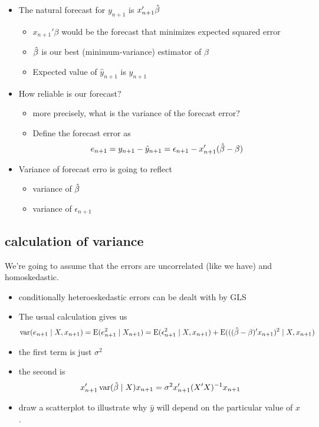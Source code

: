\begin{itemize}
\item The natural forecast for $y_{n+1}$ is $x_{n+1}'\hat{\beta}$
\begin{itemize}
\item $x_{n+1}'\beta$ would be the forecast that minimizes expected
         squared error
\item $\hat{\beta}$ is our best (minimum-variance) estimator of $\beta$
\item Expected value of $\hat y_{n+1}$ is $y_{n+1}$
\end{itemize}
\item How reliable is our forecast?
\begin{itemize}
\item more precisely, what is the variance of the forecast error?
\item Define the forecast error as 
  \[ e_{n+1} = y_{n+1} - \hat y_{n+1} = \epsilon_{n+1} - x_{n+1}'(\hat{\beta} - \beta) \]
\end{itemize}
\item Variance of forecast erro is going to reflect
\begin{itemize}
\item variance of $\hat{\beta}$
\item variance of $\epsilon_{n+1}$
\end{itemize}
\end{itemize}

\subsection{calculation of variance}

     We're going to assume that the errors are uncorrelated (like we
     have) and homoskedastic.
\begin{itemize}
\item conditionally heteroeskedastic errors can be dealt with by GLS
\item The usual calculation gives us
  \[ \operatorname{var}(e_{n+1} \mid X, x_{n+1}) = \operatorname{E}(e_{n+1}^2 \mid X_{n+1}) = \operatorname{E}(\epsilon_{n+1}^2
  \mid X, x_{n+1}) + \operatorname{E}(((\hat{\beta} - \beta)'x_{n+1})^2 \mid X, x_{n+1})\]
\item the first term is just $\sigma^2$
\item the second is 
  \[ x_{n+1}' \operatorname{var}(\hat{\beta} \mid X) x_{n+1} = \sigma^2 x_{n+1}'(X'X)^{-1}x_{n+1}\]
\item draw a scatterplot to illustrate why $\hat y$ will depend on
       the particular value of $x$.
\end{itemize}

